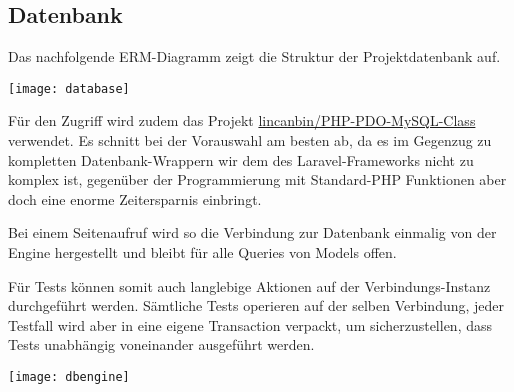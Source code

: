 \subsection{Datenbank}
Das nachfolgende ERM-Diagramm zeigt die Struktur der Projektdatenbank auf.

\vspace{2mm}
\texttt{[image: database]}
\vspace{2mm}

\noindent
Für den Zugriff wird zudem das Projekt \href{https://github.com/lincanbin/PHP-PDO-MySQL-Class}{lincanbin/PHP-PDO-MySQL-Class} verwendet. Es schnitt bei der Vorauswahl am besten ab, da es im Gegenzug zu kompletten Datenbank-Wrappern wir dem des Laravel-Frameworks nicht zu komplex ist, gegenüber der Programmierung mit Standard-PHP Funktionen aber doch eine enorme Zeitersparnis einbringt.

Bei einem Seitenaufruf wird so die Verbindung zur Datenbank einmalig von der Engine hergestellt und bleibt für alle Queries von Models offen.

Für Tests können somit auch langlebige Aktionen auf der Verbindungs-Instanz durchgeführt werden. Sämtliche Tests operieren auf der selben Verbindung, jeder Testfall wird aber in eine eigene Transaction verpackt, um sicherzustellen, dass Tests unabhängig voneinander ausgeführt werden.

\vspace{2mm}
\texttt{[image: dbengine]}
\vspace{2mm}